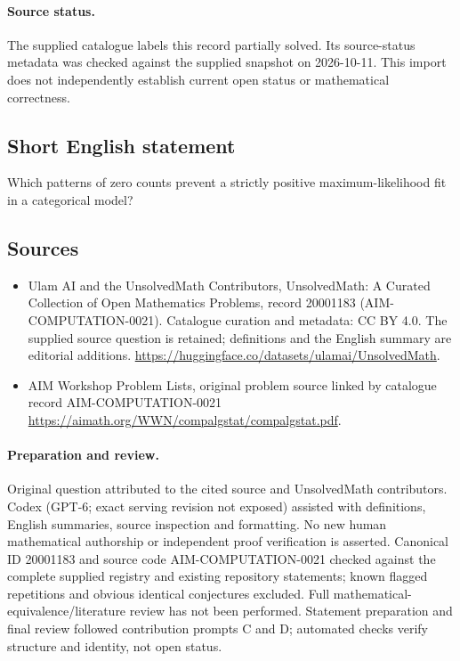 \documentclass[11pt]{article}
\begin{document}
\paragraph{Source status.}
The supplied catalogue labels this record partially solved. Its source-status metadata was checked against the supplied snapshot on 2026-10-11. This import does not independently establish current open status or mathematical correctness.
\subsection{Short English statement}
Which patterns of zero counts prevent a strictly positive maximum-likelihood fit in a categorical model?
\subsection{Sources}
\begin{itemize}
\item[\hypertarget{source:20001183:1}{S1}] Ulam AI and the UnsolvedMath Contributors, UnsolvedMath: A Curated Collection of Open Mathematics Problems, record 20001183 (AIM-COMPUTATION-0021). Catalogue curation and metadata: CC BY 4.0. The supplied source question is retained; definitions and the English summary are editorial additions.
\url{https://huggingface.co/datasets/ulamai/UnsolvedMath}.
\item[\hypertarget{source:20001183:2}{S2}] AIM Workshop Problem Lists, original problem source linked by catalogue record AIM-COMPUTATION-0021
\url{https://aimath.org/WWN/compalgstat/compalgstat.pdf}.
\end{itemize}
\paragraph{Preparation and review.}
Original question attributed to the cited source and UnsolvedMath contributors. Codex (GPT-6; exact serving revision not exposed) assisted with definitions, English summaries, source inspection and formatting. No new human mathematical authorship or independent proof verification is asserted. Canonical ID 20001183 and source code AIM-COMPUTATION-0021 checked against the complete supplied registry and existing repository statements; known flagged repetitions and obvious identical conjectures excluded. Full mathematical-equivalence/literature review has not been performed. Statement preparation and final review followed contribution prompts C and D; automated checks verify structure and identity, not open status.
\label{end:20001183}
\end{document}
